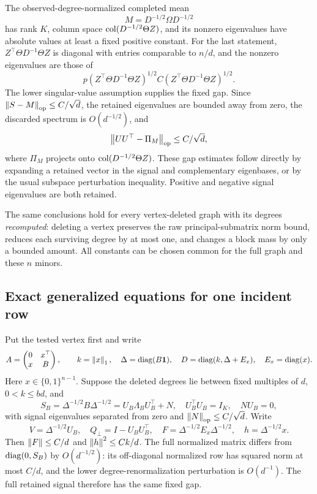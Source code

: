 The observed-degree-normalized completed mean
\[
 M=D^{-1/2}\Omega D^{-1/2}
\]
has rank $K$, column space $\operatorname{col}(D^{-1/2}\Theta Z)$, and its nonzero
eigenvalues have absolute values at least a fixed positive constant.
For the last statement,
$Z^\top\Theta D^{-1}\Theta Z$ is diagonal with entries comparable to
$n/d$, and the nonzero eigenvalues are those of
\[
 p(Z^\top\Theta D^{-1}\Theta Z)^{1/2}
 C(Z^\top\Theta D^{-1}\Theta Z)^{1/2}.
\]
The lower singular-value assumption supplies the fixed gap.
Since $\left\lVert S-M\right\rVert_{\mathrm{op}}\le C/\sqrt d$, the retained eigenvalues are
bounded away from zero, the discarded spectrum is $O(d^{-1/2})$, and
\begin{equation}\label{eq:normalized-angle}
 \left\lVert UU^\top-\Pi_M\right\rVert_{\mathrm{op}}\le C/\sqrt d,
\end{equation}
where $\Pi_M$ projects onto $\operatorname{col}(D^{-1/2}\Theta Z)$.
These gap estimates follow directly by expanding a retained vector in the
signal and complementary eigenbases, or by the usual subspace perturbation
inequality. Positive and negative signal eigenvalues are both retained.

The same conclusions hold for every vertex-deleted graph with its degrees
\emph{recomputed}: deleting a vertex preserves the raw principal-submatrix
norm bound, reduces each surviving degree by at most one, and changes a
block mass by only a bounded amount. All constants can be chosen common
for the full graph and these $n$ minors.

\subsection{Exact generalized equations for one incident row}

Put the tested vertex first and write
\begin{equation}\label{eq:arrowhead-A}
 A=\begin{pmatrix}0&x^\top\\x&B\end{pmatrix},\qquad
 k=\left\lVert x\right\rVert_1,\quad \Delta=\operatorname{diag}(B\mathbf 1),\quad
 D=\operatorname{diag}(k,\Delta+E_x),\quad E_x=\operatorname{diag}(x).
\end{equation}
Here $x\in\{0,1\}^{n-1}$. Suppose the deleted degrees lie between
fixed multiples of $d$, $0<k\le bd$, and
\[
 S_B=\Delta^{-1/2}B\Delta^{-1/2}
    =U_B\Lambda_BU_B^\top+N,
 \quad U_B^\top U_B=I_K,\quad NU_B=0,
\]
with signal eigenvalues separated from zero and
$\left\lVert N\right\rVert_{\mathrm{op}}\le C/\sqrt d$. Write
\[
 V=\Delta^{-1/2}U_B,\quad Q_\perp=I-U_BU_B^\top,\quad
 F=\Delta^{-1/2}E_x\Delta^{-1/2},\quad h=\Delta^{-1/2}x.
\]
Then $\left\lVert F\right\rVert\le C/d$ and $\left\lVert h\right\rVert^2\le Ck/d$.
The full normalized matrix differs from $\operatorname{diag}(0,S_B)$ by
$O(d^{-1/2})$: its off-diagonal normalized row has squared norm at most
$C/d$, and the lower degree-renormalization perturbation is $O(d^{-1})$.
The full retained signal therefore has the same fixed gap.

